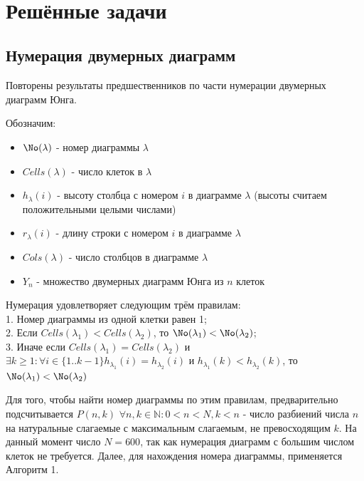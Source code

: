 \documentclass[12pt]{report}
\begin{document}
\newpage
\hfill {}\\

\section* {Решённые задачи}
\parindent=1cm
\newenvironment{myindentpar}[1]%
 {\begin{list}{}%
         {\setlength{\leftmargin}{#1}}%
         \item[]%
 }
 {\end{list}}
 
\subsection*{Нумерация двумерных диаграмм}
\hspace{\parindent} Повторены результаты предшественников по части нумерации двумерных диаграмм Юнга. 

Обозначим: 

\begin{itemize}
  \item $\No(\lambda)$  - номер диаграммы $\lambda$
  \item $Cells(\lambda)$  - число клеток в $\lambda$
  \item $h_\lambda(i)$ - высоту столбца с номером $i$ в диаграмме $\lambda$ (высоты считаем положительными целыми числами)
  \item $r_\lambda(i)$ - длину строки с номером $i$ в диаграмме $\lambda$
  \item $Cols(\lambda)$ - число столбцов в диаграмме $\lambda$
  \item $Y_n$ - множество двумерных диаграмм Юнга из $n$ клеток
\end{itemize}
Нумерация удовлетворяет следующим трём правилам:\\
1. Номер диаграммы из одной клетки равен 1;\\
2. Если $Cells(\lambda_1) < Cells(\lambda_2)$, то $\No(\lambda_1) < \No(\lambda_2)$;\\
3. Иначе если $Cells(\lambda_1) = Cells(\lambda_2)$ и $\exists k \ge 1 : \forall i \in \{1..k-1\} h_{\lambda_1}(i) = h_{\lambda_2}(i)$ и $h_{\lambda_1}(k) < h_{\lambda_2}(k)$, то $\No(\lambda_1) < \No(\lambda_2)$

Для того, чтобы найти номер диаграммы по этим правилам, предварительно подсчитывается $P(n, k)$ $\forall n, k \in \mathbb{N} : 0 < n < N, k < n$ - число разбиений числа $n$ на натуральные слагаемые с максимальным слагаемым, не превосходящим $k$. На данный момент число $N = 600$, так как нумерация диаграмм с большим числом клеток не требуется. Далее, для нахождения номера диаграммы, применяется Алгоритм 1.
\vspace{1cm}
\end{document}
